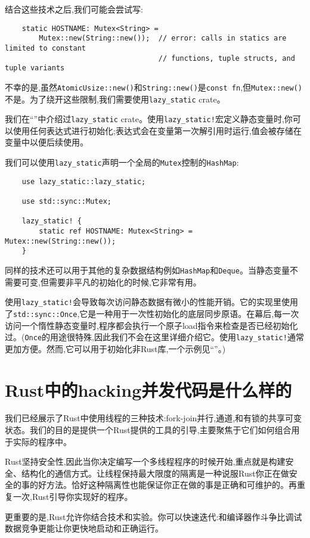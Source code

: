 结合这些技术之后,我们可能会尝试写:
\begin{verbatim}
    static HOSTNAME: Mutex<String> =
        Mutex::new(String::new());  // error: calls in statics are limited to constant
                                    // functions, tuple structs, and tuple variants
\end{verbatim}

不幸的是,虽然\texttt{AtomicUsize::new()}和\texttt{String::new()}是\texttt{const fn},但\texttt{Mutex::new()}不是。为了绕开这些限制,我们需要使用\texttt{lazy\_static} crate。

我们在“”中介绍过\texttt{lazy\_static} crate。使用\texttt{lazy\_static!}宏定义静态变量时,你可以使用任何表达式进行初始化;表达式会在变量第一次解引用时运行,值会被存储在变量中以便后续使用。

我们可以使用\texttt{lazy\_static}声明一个全局的\texttt{Mutex}控制的\texttt{HashMap}:
\begin{verbatim}
    use lazy_static::lazy_static;

    use std::sync::Mutex;

    lazy_static! {
        static ref HOSTNAME: Mutex<String> = Mutex::new(String::new());
    }
\end{verbatim}

同样的技术还可以用于其他的复杂数据结构例如\texttt{HashMap}和\texttt{Deque}。当静态变量不需要可变,但需要非平凡的初始化的时候,它非常有用。

使用\texttt{lazy\_static!}会导致每次访问静态数据有微小的性能开销。它的实现里使用了\texttt{std::sync::Once},它是一种用于一次性初始化的底层同步原语。在幕后,每一次访问一个惰性静态变量时,程序都会执行一个原子load指令来检查是否已经初始化过。(\texttt{Once}的用途很特殊,因此我们不会在这里详细介绍它。使用\texttt{lazy\_static!}通常更加方便。然而,它可以用于初始化非Rust库,一个示例见“”。)

\section{Rust中的hacking并发代码是什么样的}

我们已经展示了Rust中使用线程的三种技术:fork-join并行,通道,和有锁的共享可变状态。我们的目的是提供一个Rust提供的工具的引导,主要聚焦于它们如何组合用于实际的程序中。

Rust坚持安全性,因此当你决定编写一个多线程程序的时候开始,重点就是构建安全、结构化的通信方式。让线程保持最大限度的隔离是一种说服Rust你正在做安全的事的好方法。恰好这种隔离性也能保证你正在做的事是正确和可维护的。再重复一次,Rust引导你实现好的程序。

更重要的是,Rust允许你结合技术和实验。你可以快速迭代:和编译器作斗争比调试数据竞争更能让你更快地启动和正确运行。
